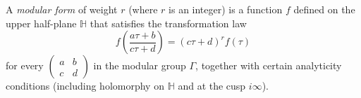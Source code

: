 A \textit{modular form} of weight $r$ (where $r$ is an integer) is a function $f$ defined on the upper half-plane $\mathbb{H}$ that satisfies the transformation law
$$f\left(\frac{a\tau + b}{c\tau + d}\right) = (c\tau + d)^r f(\tau)$$
for every $\begin{pmatrix} a & b \\ c & d \end{pmatrix}$ in the modular group $\Gamma$, together with certain analyticity conditions (including holomorphy on $\mathbb{H}$ and at the cusp $i\infty$).

